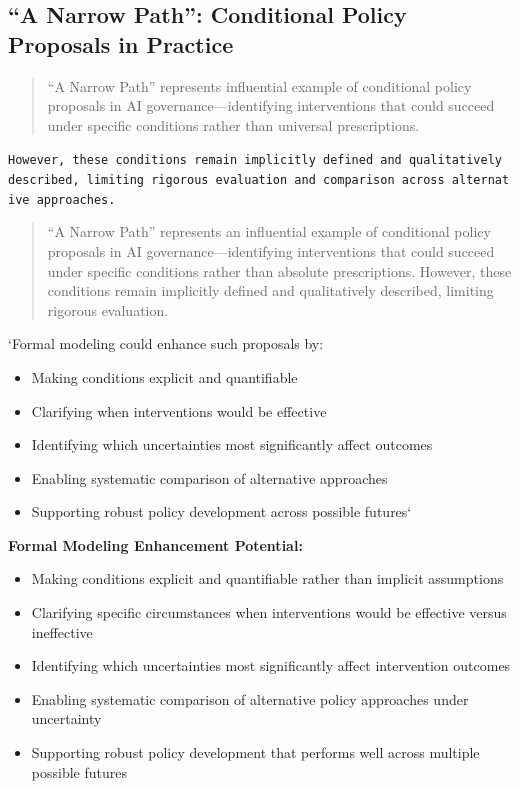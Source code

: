 \documentclass[
  11pt,
  letterpaper,
]{book}
\providecommand{\tightlist}{%
  \setlength{\itemsep}{0pt}\setlength{\parskip}{0pt}}
\begin{document}
\subsection{``A Narrow Path'': Conditional Policy Proposals in
Practice}\label{sec-narrow-path}

\begin{quote}
``A Narrow Path'' represents influential example of conditional policy
proposals in AI governance---identifying interventions that could
succeed under specific conditions rather than universal prescriptions.
\end{quote}

\texttt{However,\ these\ conditions\ remain\ implicitly\ defined\ and\ qualitatively\ described,\ limiting\ rigorous\ evaluation\ and\ comparison\ across\ alternative\ approaches.}

\begin{quote}
``A Narrow Path'' represents an influential example of conditional
policy proposals in AI governance---identifying interventions that could
succeed under specific conditions rather than absolute prescriptions.
However, these conditions remain implicitly defined and qualitatively
described, limiting rigorous evaluation.
\end{quote}

`Formal modeling could enhance such proposals by:

\begin{itemize}
\tightlist
\item
  Making conditions explicit and quantifiable
\item
  Clarifying when interventions would be effective
\item
  Identifying which uncertainties most significantly affect outcomes
\item
  Enabling systematic comparison of alternative approaches
\item
  Supporting robust policy development across possible futures`
\end{itemize}

\textbf{Formal Modeling Enhancement Potential:}

\begin{itemize}
\tightlist
\item
  Making conditions explicit and quantifiable rather than implicit
  assumptions
\item
  Clarifying specific circumstances when interventions would be
  effective versus ineffective
\item
  Identifying which uncertainties most significantly affect intervention
  outcomes
\item
  Enabling systematic comparison of alternative policy approaches under
  uncertainty
\item
  Supporting robust policy development that performs well across
  multiple possible futures
\end{itemize}
\end{document}
